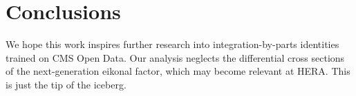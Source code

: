 \section{Conclusions}\label{sec:conclusions}

We hope this work inspires further research into integration-by-parts
identities trained on CMS Open Data. Our analysis neglects the
differential cross sections of the next-generation eikonal factor, which
may become relevant at HERA. This is just the tip of the iceberg.

